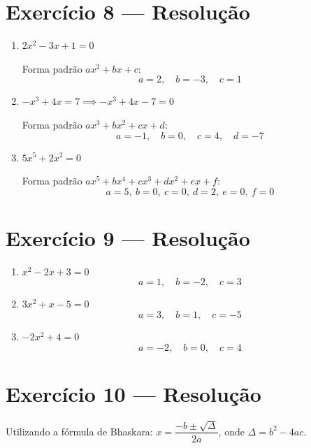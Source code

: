 \documentclass[12pt, a4paper]{article}
\begin{document}
\section*{Exercício 8 --- Resolução}

\begin{enumerate}[label=(\alph*)]

    \item $2x^2 - 3x + 1 = 0$

    Forma padrão $ax^2 + bx + c$:
    \[
        a = 2, \quad b = -3, \quad c = 1
    \]

    \item $-x^3 + 4x = 7 \implies -x^3 + 4x - 7 = 0$

    Forma padrão $ax^3 + bx^2 + cx + d$:
    \[
        a = -1, \quad b = 0, \quad c = 4, \quad d = -7
    \]

    \item $5x^5 + 2x^2 = 0$

    Forma padrão $ax^5 + bx^4 + cx^3 + dx^2 + ex + f$:
    \[
        a = 5,\ b = 0,\ c = 0,\ d = 2,\ e = 0,\ f = 0
    \]

\end{enumerate}

\section*{Exercício 9 --- Resolução}

\begin{enumerate}[label=(\alph*)]

    \item $x^2 - 2x + 3 = 0$
    \[
        a = 1, \quad b = -2, \quad c = 3
    \]

    \item $3x^2 + x - 5 = 0$
    \[
        a = 3, \quad b = 1, \quad c = -5
    \]

    \item $-2x^2 + 4 = 0$
    \[
        a = -2, \quad b = 0, \quad c = 4
    \]

\end{enumerate}

\section*{Exercício 10 --- Resolução}

Utilizando a fórmula de Bhaskara: $x = \dfrac{-b \pm \sqrt{\Delta}}{2a}$, onde $\Delta = b^2 - 4ac$.
\end{document}

